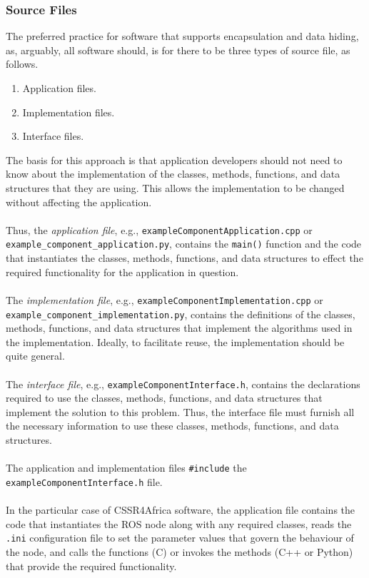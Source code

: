 \documentclass{CSSRforAfrica}
\newcommand{\blank}{~\\}
\begin{document}
\begin{appendices}
\subsubsection{Source Files}

The preferred practice for software that supports encapsulation and data hiding, as, arguably, all software should, is for there to be three types of source file, as follows. 
\begin{enumerate}
\item Application files. \vspace{-2mm}
\item Implementation files. \vspace{-2mm}
\item Interface files.\vspace{-2mm}
\end{enumerate}
The basis for this approach is that application developers should not need to know about the implementation of the classes, methods, functions, and data structures that they are using.  This allows the implementation to be changed without affecting the application.
\blank
~
\blank
Thus, the {\em application file}, e.g., {\small \verb+exampleComponentApplication.cpp+}  or { \\{\small \verb+example_component_application.py+}},  contains the {\small \verb+main()+} function and the code that instantiates the classes, methods, functions, and data structures to effect the required functionality for the application in question.
\blank
~
\blank
The {\em implementation file}, e.g., {\small \verb+exampleComponentImplementation.cpp+} {or \\ {\small \verb+example_component_implementation.py+}}, contains the definitions of the classes, methods, functions, and data structures that implement the algorithms used in the implementation. Ideally, to facilitate reuse, the  implementation should be quite general.
\blank
~
\blank
The {\em interface file}, e.g., {\small \verb+exampleComponentInterface.h+}, contains the declarations required to use the classes, methods, functions, and data structures  that implement the solution to this problem. Thus, the interface file must furnish all the necessary information to use these classes, methods, functions, and data structures.
\blank
~
\blank
The application and implementation files {\small \verb+#include+} the {\small \verb+exampleComponentInterface.h+} file.
\blank
~
\blank
In the particular case of  CSSR4Africa software, the application file contains the code that instantiates the ROS node along with any required classes, reads the {\small \verb+.ini+} configuration file to set the parameter values that govern the behaviour of the node, and calls the functions (C) or invokes the methods (C++ or Python) that provide the required functionality.

\end{appendices}
\end{document}
